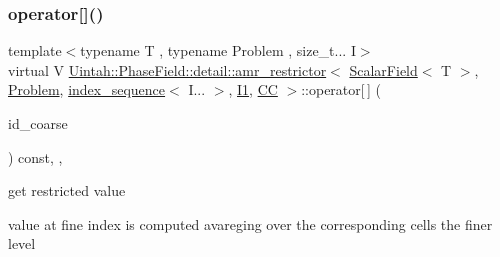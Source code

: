 \mbox{\label{classUintah_1_1PhaseField_1_1detail_1_1amr__restrictor_3_01ScalarField_3_01T_01_4_00_01Problem_0778720acc9a55f696b8537356a4dbcae_a799928df9c231704c14239ab59173e67}} 
\subsubsection{\texorpdfstring{operator[]()}{operator[]()}\hspace{0.1cm}{\footnotesize\ttfamily [2/2]}}
{\footnotesize\ttfamily template$<$typename T , typename Problem , size\+\_\+t... I$>$ \\
virtual V \hyperlink{classUintah_1_1PhaseField_1_1detail_1_1amr__restrictor}{Uintah\+::\+Phase\+Field\+::detail\+::amr\+\_\+restrictor}$<$ \hyperlink{structUintah_1_1PhaseField_1_1ScalarField}{Scalar\+Field}$<$ T $>$, \hyperlink{classUintah_1_1PhaseField_1_1Problem}{Problem}, \hyperlink{namespaceUintah_1_1PhaseField_a237de804d99512e50613aff7c94a9461}{index\+\_\+sequence}$<$ I... $>$, \hyperlink{namespaceUintah_1_1PhaseField_a547ce3002aa97fbd3ef3192a6eec8406a66f19efe774b0d2b6e5844eb2d83d305}{I1}, \hyperlink{namespaceUintah_1_1PhaseField_a33d355affda78a83f45755ba8388cedda22303704507d024d1d6508ed9859a85a}{CC} $>$\+::operator\mbox{[}$\,$\mbox{]} (\begin{DoxyParamCaption}\item[{const Int\+Vector \&}]{id\+\_\+coarse }\end{DoxyParamCaption}) const\hspace{0.3cm}{\ttfamily [inline]}, {\ttfamily [override]}, {\ttfamily [virtual]}}



get restricted value 

value at fine index is computed avareging over the corresponding cells the finer level


